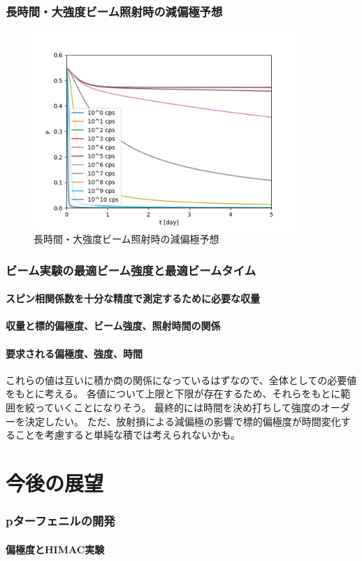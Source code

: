 \documentclass[a5j]{jsarticle}
\begin{document}
\section{長時間・大強度ビーム照射時の減偏極予想}
\begin{figure}[h]
  \centering
  \includegraphics[width=10cm]{graph/longtime.png}
  \caption{長時間・大強度ビーム照射時の減偏極予想}
\end{figure}

\section{ビーム実験の最適ビーム強度と最適ビームタイム}
\subsection{スピン相関係数を十分な精度で測定するために必要な収量}
\subsection{収量と標的偏極度、ビーム強度、照射時間の関係}
\subsection{要求される偏極度、強度、時間}
これらの値は互いに積か商の関係になっているはずなので、全体としての必要値をもとに考える。
各値について上限と下限が存在するため、それらをもとに範囲を絞っていくことになりそう。
最終的には時間を決め打ちして強度のオーダーを決定したい。
ただ、放射損による減偏極の影響で標的偏極度が時間変化することを考慮すると単純な積では考えられないかも。

\part{今後の展望}
\section{pターフェニルの開発}
\subsection{偏極度とHIMAC実験}
\end{document}
